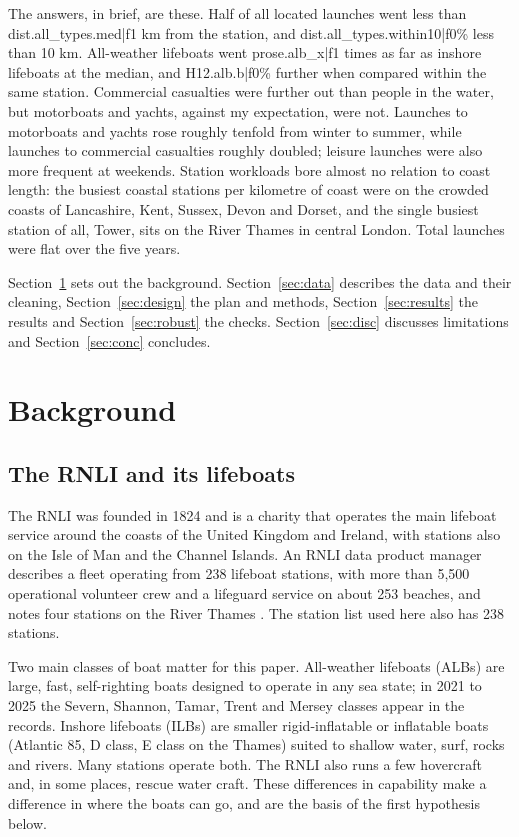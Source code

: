 \documentclass[11pt,a4paper]{article}
\begin{document}
The answers, in brief, are these. Half of all located launches went less than {{dist.all_types.med|f1}} km from the station, and {{dist.all_types.within10|f0}}\% less than 10 km. All-weather lifeboats went {{prose.alb_x|f1}} times as far as inshore lifeboats at the median, and {{H12.alb.b|f0}}\% further when compared within the same station. Commercial casualties were further out than people in the water, but motorboats and yachts, against my expectation, were not. Launches to motorboats and yachts rose roughly tenfold from winter to summer, while launches to commercial casualties roughly doubled; leisure launches were also more frequent at weekends. Station workloads bore almost no relation to coast length: the busiest coastal stations per kilometre of coast were on the crowded coasts of Lancashire, Kent, Sussex, Devon and Dorset, and the single busiest station of all, Tower, sits on the River Thames in central London. Total launches were flat over the five years.

Section~\ref{sec:lit} sets out the background. Section~\ref{sec:data} describes the data and their cleaning, Section~\ref{sec:design} the plan and methods, Section~\ref{sec:results} the results and Section~\ref{sec:robust} the checks. Section~\ref{sec:disc} discusses limitations and Section~\ref{sec:conc} concludes.

\section{Background}\label{sec:lit}
\subsection{The RNLI and its lifeboats}
The RNLI was founded in 1824 and is a charity that operates the main lifeboat service around the coasts of the United Kingdom and Ireland, with stations also on the Isle of Man and the Channel Islands. An RNLI data product manager describes a fleet operating from 238 lifeboat stations, with more than 5,500 operational volunteer crew and a lifeguard service on about 253 beaches, and notes four stations on the River Thames \citep{wright2021}. The station list used here also has 238 stations.

Two main classes of boat matter for this paper. All-weather lifeboats (ALBs) are large, fast, self-righting boats designed to operate in any sea state; in 2021 to 2025 the Severn, Shannon, Tamar, Trent and Mersey classes appear in the records. Inshore lifeboats (ILBs) are smaller rigid-inflatable or inflatable boats (Atlantic 85, D class, E class on the Thames) suited to shallow water, surf, rocks and rivers. Many stations operate both. The RNLI also runs a few hovercraft and, in some places, rescue water craft. These differences in capability make a difference in where the boats can go, and are the basis of the first hypothesis below.
\end{document}
